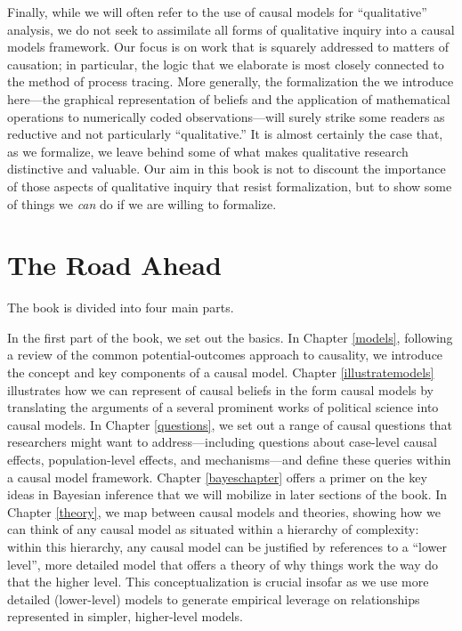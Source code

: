 \documentclass[
  12pt,
]{book}
\begin{document}
Finally, while we will often refer to the use of causal models for ``qualitative'' analysis, we do not seek to assimilate all forms of qualitative inquiry into a causal models framework. Our focus is on work that is squarely addressed to matters of causation; in particular, the logic that we elaborate is most closely connected to the method of process tracing. More generally, the formalization the we introduce here---the graphical representation of beliefs and the application of mathematical operations to numerically coded observations---will surely strike some readers as reductive and not particularly ``qualitative.'' It is almost certainly the case that, as we formalize, we leave behind some of what makes qualitative research distinctive and valuable. Our aim in this book is not to discount the importance of those aspects of qualitative inquiry that resist formalization, but to show some of things we \emph{can} do if we are willing to formalize.

\hypertarget{the-road-ahead}{%
\section{The Road Ahead}\label{the-road-ahead}}

The book is divided into four main parts.

In the first part of the book, we set out the basics. In Chapter \ref{models}, following a review of the common potential-outcomes approach to causality, we introduce the concept and key components of a causal model. Chapter \ref{illustratemodels} illustrates how we can represent of causal beliefs in the form causal models by translating the arguments of a several prominent works of political science into causal models. In Chapter \ref{questions}, we set out a range of causal questions that researchers might want to address---including questions about case-level causal effects, population-level effects, and mechanisms---and define these queries within a causal model framework. Chapter \ref{bayeschapter} offers a primer on the key ideas in Bayesian inference that we will mobilize in later sections of the book. In Chapter \ref{theory}, we map between causal models and theories, showing how we can think of any causal model as situated within a hierarchy of complexity: within this hierarchy, any causal model can be justified by references to a ``lower level'', more detailed model that offers a theory of why things work the way do that the higher level. This conceptualization is crucial insofar as we use more detailed (lower-level) models to generate empirical leverage on relationships represented in simpler, higher-level models.
\end{document}
